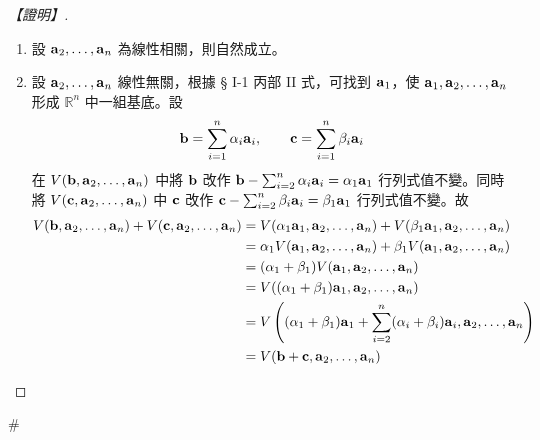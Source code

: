 \begin{proof}[【證明】]
\begin{enumerate}[label=(\roman*), leftmargin=2em]
  \item 設 $\vect{a}_2, \dots, \vect{a}_n$ 為線性相關，則自然成立。
  \item 設 $\vect{a}_2, \dots, \vect{a}_n$ 線性無關，根據 § I-1 丙部 II 式，可找到 $\vect{a}_1$，使 $\vect{a}_1, \vect{a}_2, \dots, \vect{a}_n$ 形成 $\mathbb{R}^n$ 中一組基底。設
  \begin{equation}
  \vect{b} = \sum_{i=1}^n \alpha_i \vect{a}_i, \qquad \vect{c} = \sum_{i=1}^n \beta_i \vect{a}_i \label{eq:b6-1-app2-1}
  \end{equation}
  在 $V(\vect{b}, \vect{a}_2, \dots, \vect{a}_n)$ 中將 $\vect{b}$ 改作 $\vect{b} - \sum_{i=2}^n \alpha_i \vect{a}_i = \alpha_1\vect{a}_1$ 行列式值不變。同時將 $V(\vect{c}, \vect{a}_2, \dots, \vect{a}_n)$ 中 $\vect{c}$ 改作 $\vect{c} - \sum_{i=2}^n \beta_i \vect{a}_i = \beta_1\vect{a}_1$ 行列式值不變。故
  \begin{align*}
  V(\vect{b}, \vect{a}_2, \dots, \vect{a}_n) + V(\vect{c}, \vect{a}_2, \dots, \vect{a}_n) &= V(\alpha_1\vect{a}_1, \vect{a}_2, \dots, \vect{a}_n) + V(\beta_1\vect{a}_1, \vect{a}_2, \dots, \vect{a}_n) \\
  &= \alpha_1 V(\vect{a}_1, \vect{a}_2, \dots, \vect{a}_n) + \beta_1 V(\vect{a}_1, \vect{a}_2, \dots, \vect{a}_n) \\
  &= (\alpha_1 + \beta_1) V(\vect{a}_1, \vect{a}_2, \dots, \vect{a}_n) \\
  &= V((\alpha_1 + \beta_1)\vect{a}_1, \vect{a}_2, \dots, \vect{a}_n) \\
  &= V\left((\alpha_1 + \beta_1)\vect{a}_1 + \sum_{i=2}^n (\alpha_i + \beta_i)\vect{a}_i, \vect{a}_2, \dots, \vect{a}_n\right) \\
  &= V(\vect{b}+\vect{c}, \vect{a}_2, \dots, \vect{a}_n)
  \end{align*}
\end{enumerate}
\end{proof}\hfill$\#$
